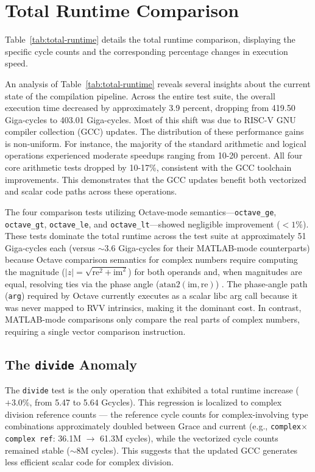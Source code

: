\section{Total Runtime Comparison}

Table~\ref{tab:total-runtime} details the total runtime comparison, displaying the specific cycle counts and the corresponding percentage changes in execution speed.



An analysis of Table~\ref{tab:total-runtime} reveals several insights about the current state of the compilation pipeline. Across the entire test suite, the overall execution time decreased by approximately 3.9 percent, dropping from 419.50 Giga-cycles to 403.01 Giga-cycles. Most of this shift was due to RISC-V GNU compiler collection (GCC) updates. The distribution of these performance gains is non-uniform. For instance, the majority of the standard arithmetic and logical operations experienced moderate speedups ranging from 10-20 percent. All four core arithmetic tests dropped by 10-17\%, consistent with the GCC toolchain improvements. This demonstrates that the GCC updates benefit both vectorized and scalar code paths across these operations.

The four comparison tests utilizing Octave-mode semantics---\texttt{octave\_ge}, \texttt{octa\-ve\_gt}, \texttt{octave\_le}, and \texttt{octave\_lt}---showed negligible improvement ($< 1\%$). These tests dominate the total runtime across the test suite at approximately 51 Giga-cycles each (versus $\sim$3.6 Giga-cycles for their MATLAB-mode counterparts) because Octave comparison semantics for complex numbers require computing the magnitude ($|z| = \sqrt{\text{re}^2 + \text{im}^2}$) for both operands and, when magnitudes are equal, resolving ties via the phase angle ($\text{atan2}(\text{im}, \text{re})$) \cite{octave_comparison_ops}. The phase-angle path (\texttt{arg}) required by Octave currently executes as a scalar libc arg call because it was never mapped to RVV intrinsics, making it the dominant cost. In contrast, MATLAB-mode comparisons only compare the real parts of complex numbers, requiring a single vector comparison instruction.

\subsection{The \texttt{divide} Anomaly}

The \texttt{divide} test is the only operation that exhibited a total runtime increase ($+3.0\%$, from 5.47 to 5.64 Gcycles). This regression is localized to complex division reference counts --- the reference cycle counts for complex-involving type combinations approximately doubled between Grace and current (e.g., \texttt{complex$\times$complex ref}: 36.1M $\rightarrow$ 61.3M cycles), while the vectorized cycle counts remained stable ($\sim$8M cycles). This suggests that the updated GCC generates less efficient scalar code for complex division.

